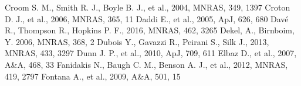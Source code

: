 \documentclass[useAMS,usenatbib]{mn2e}
\begin{document}
\begin{thebibliography}{}
 Croom S. M., Smith R. J., Boyle B. J., et al., 2004, MNRAS, 349, 1397
 Croton D. J., et al., 2006, MNRAS, 365, 11
 Daddi E., et al., 2005, ApJ, 626, 680
 Dav\'e R., Thompson R., Hopkins P. F., 2016, MNRAS, 462, 3265
 Dekel, A., Birnboim, Y. 2006, MNRAS, 368, 2
 Dubois Y., Gavazzi R., Peirani S., Silk J., 2013, MNRAS, 433, 3297
 Dunn J. P., et al., 2010, ApJ, 709, 611
 Elbaz D., et al., 2007, A\&A, 468, 33
 Fanidakis N., Baugh C. M., Benson A. J., et al., 2012, MNRAS, 419, 2797
 Fontana A., et al., 2009, A\&A, 501, 15

\end{thebibliography}
\end{document}
